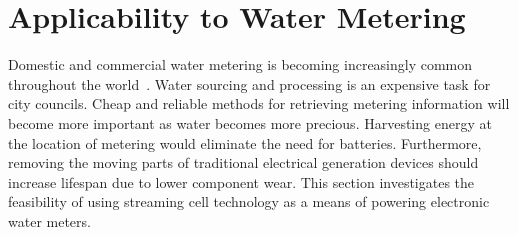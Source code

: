 

%     


%     

  \chapter{Applicability to Water Metering}
    \label{chap:wirelessWaterMetering}
    Domestic and commercial water metering is becoming increasingly common throughout the world~\cite{Chang2012}.
    Water sourcing and processing is an expensive task for city councils.
    Cheap and reliable methods for retrieving metering information will become more important as water becomes more precious.
    Harvesting energy at the location of metering would eliminate the need for batteries.
    Furthermore, removing the moving parts of traditional electrical generation devices should increase lifespan due to lower component wear.
    This section investigates the feasibility of using streaming cell technology as a means of powering electronic water meters.
    

